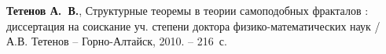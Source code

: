 \begin{thebibliography}{99}
{\bf Тетенов А.~В.}, 
Структурные теоремы в теории самоподобных фракталов : диссертация на соискание уч. степени доктора физико-математических наук / А.В. Тетенов -- Горно-Алтайск, 2010. -- 216~с. 


%












%
    

\end{thebibliography}

